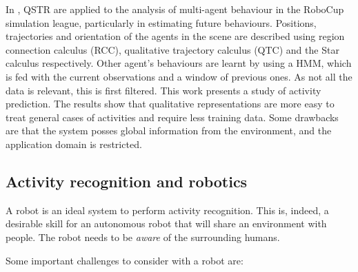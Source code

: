 In \citep{Young13_PredcitingSituatedBehaviour,Young14_EffectsTraining}, QSTR are applied to the analysis of multi-agent behaviour in the RoboCup simulation league, particularly in estimating future behaviours. 
Positions, trajectories and orientation of the agents in the scene are described using region connection calculus (RCC), qualitative trajectory calculus (QTC) and the Star calculus respectively. 
Other agent's behaviours are learnt by using a HMM, which is fed with the current observations and a window of previous ones. 
As not all the data is relevant, this is first filtered. 
This work presents a study of activity prediction.
The results show that qualitative representations are more easy to treat general cases of activities and require less training data.
Some drawbacks are that the system posses global information from the environment, and the application domain is restricted.








\subsection{Activity recognition and robotics}
A robot is an ideal system to perform activity recognition. 
This is, indeed, a desirable skill for an autonomous robot that will share an environment with people.
The robot needs to be \textit{aware} of the surrounding humans.

Some important challenges to consider with a robot are:

